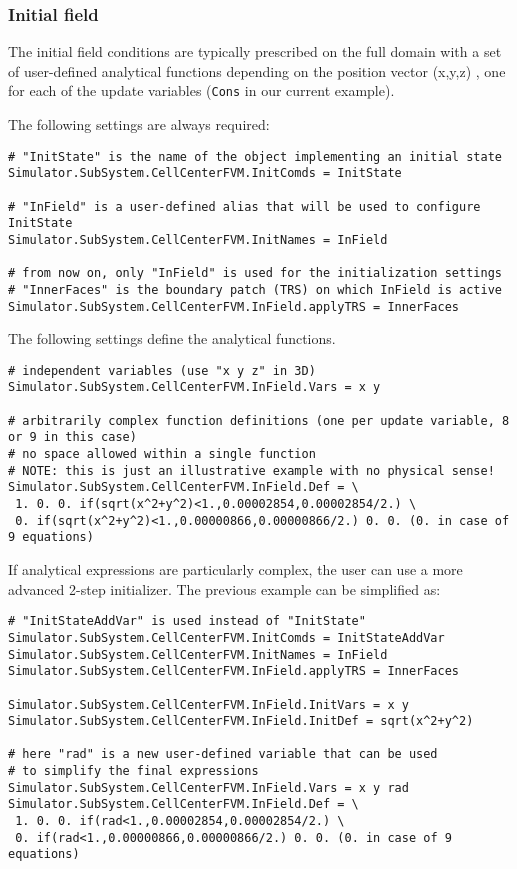 \documentclass[11pt]{article}
\begin{document}
\subsubsection{Initial field}

The initial field conditions are typically prescribed on the full domain with a set of 
user-defined analytical functions depending on the position vector (x,y,z) \cite{FParser}, 
one for each of the update variables ({\tt Cons} in our current example). 

The following settings are always required:
\begin{lstlisting}[breaklines]
# "InitState" is the name of the object implementing an initial state 
Simulator.SubSystem.CellCenterFVM.InitComds = InitState

# "InField" is a user-defined alias that will be used to configure InitState
Simulator.SubSystem.CellCenterFVM.InitNames = InField

# from now on, only "InField" is used for the initialization settings
# "InnerFaces" is the boundary patch (TRS) on which InField is active
Simulator.SubSystem.CellCenterFVM.InField.applyTRS = InnerFaces
\end{lstlisting}

The following settings define the analytical functions.
\begin{lstlisting}[breaklines] 
# independent variables (use "x y z" in 3D)
Simulator.SubSystem.CellCenterFVM.InField.Vars = x y  

# arbitrarily complex function definitions (one per update variable, 8 or 9 in this case)
# no space allowed within a single function
# NOTE: this is just an illustrative example with no physical sense!
Simulator.SubSystem.CellCenterFVM.InField.Def = \
 1. 0. 0. if(sqrt(x^2+y^2)<1.,0.00002854,0.00002854/2.) \
 0. if(sqrt(x^2+y^2)<1.,0.00000866,0.00000866/2.) 0. 0. (0. in case of 9 equations) 
\end{lstlisting}

If analytical expressions are particularly complex, the user can use a more advanced 2-step initializer. The previous example can be simplified as:

\begin{lstlisting}[breaklines]
# "InitStateAddVar" is used instead of "InitState"
Simulator.SubSystem.CellCenterFVM.InitComds = InitStateAddVar
Simulator.SubSystem.CellCenterFVM.InitNames = InField
Simulator.SubSystem.CellCenterFVM.InField.applyTRS = InnerFaces

Simulator.SubSystem.CellCenterFVM.InField.InitVars = x y
Simulator.SubSystem.CellCenterFVM.InField.InitDef = sqrt(x^2+y^2)

# here "rad" is a new user-defined variable that can be used 
# to simplify the final expressions 
Simulator.SubSystem.CellCenterFVM.InField.Vars = x y rad
Simulator.SubSystem.CellCenterFVM.InField.Def = \
 1. 0. 0. if(rad<1.,0.00002854,0.00002854/2.) \
 0. if(rad<1.,0.00000866,0.00000866/2.) 0. 0. (0. in case of 9 equations) 
\end{lstlisting}
\end{document}
